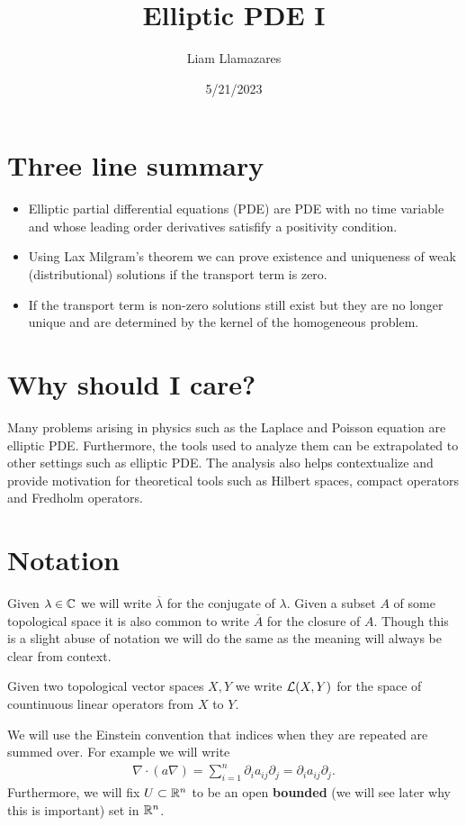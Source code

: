 \documentclass[12pt]{article}
\begin{document}
\title{Elliptic PDE I}
\author{Liam Llamazares}
\date{5/21/2023}
\maketitle
\section{ Three line summary}
\begin{itemize}
	\item Elliptic partial differential equations (PDE) are PDE with no time variable and whose leading order derivatives satisfify a positivity condition.
	\item Using Lax Milgram's theorem we can prove existence and uniqueness of weak (distributional) solutions if the transport term is zero.
	\item If the transport term is non-zero solutions still exist but they are no longer unique and are determined by the kernel of the homogeneous problem.\end{itemize}
\section{Why should I care?}
Many problems arising in physics such as the Laplace and Poisson equation are elliptic PDE. Furthermore, the tools used to analyze them can be extrapolated to other settings such as
elliptic PDE. The analysis also helps contextualize and provide motivation for theoretical tools such as Hilbert spaces, compact operators and Fredholm operators.
\section{Notation}
Given $\lambda \in \mathbb{C}$ we will write $\overline{\lambda }$ for the conjugate of $\lambda $. Given a subset $A$ of some topological space it is also common to write  $\overline{A}$ for the closure of $A$. Though this is a slight abuse of notation we will do the same as the meaning will always be clear from context.

Given two topological vector spaces $X,Y$ we write  $\mathcal{L}(X,Y)$ for the space of countinuous linear operators from $X$ to  $Y$.

We will use the Einstein convention that indices when they are repeated are summed over. For example we will write
\begin{align*}
	\nabla \cdot (a \nabla)=\sum_{i=1}^n \partial_i a_{ij} \partial _j =\partial_i a_{ij} \partial _j.
\end{align*}
Furthermore, we will fix $U \subset \mathbb{R}^n$ to be an open \textbf{bounded} (we will see later why this is important) set in $\mathbb{R}^n$.
\end{document}
